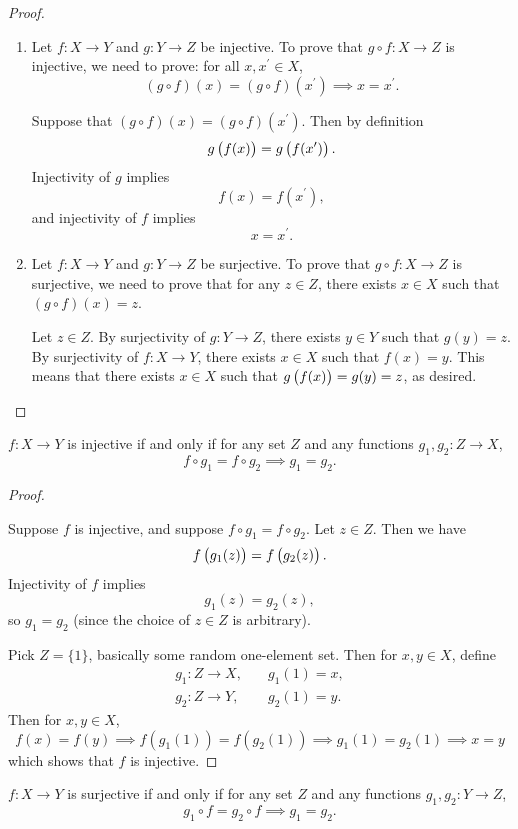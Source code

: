 \begin{proof} \
\begin{enumerate}[label=(\roman*)]
\item Let $f:X \to Y$ and $g:Y \to Z$ be injective. To prove that $g \circ f:X\to Z$ is injective, we need to prove: for all $x,x^\prime\in X$, 
\[(g \circ f)(x)=(g\circ f)(x^\prime) \implies x=x^\prime.\]

Suppose that $(g \circ f)(x) = (g \circ f)(x^\prime)$. Then by definition
\[g\left(f(x)\right)=g\left(f(x^\prime)\right).\]
Injectivity of $g$ implies
\[f(x)=f(x^\prime),\]
and injectivity of $f$ implies
\[x=x^\prime.\]

\item Let $f:X\to Y$ and $g:Y\to Z$ be surjective. To prove that $g\circ f:X\to Z$ is surjective, we need to prove that for any $z\in Z$, there exists $x\in X$ such that $(g\circ f)(x)=z$.

Let $z\in Z$. By surjectivity of $g:Y\to Z$, there exists $y\in Y$ such that $g(y)=z$. By surjectivity of $f:X\to Y$, there exists $x\in X$ such that $f(x)=y$. This means that there exists $x\in X$ such that $g\left(f(x)\right)=g(y)=z$, as desired.
\end{enumerate}
\end{proof}

\begin{proposition}
$f:X\to Y$ is injective if and only if for any set $Z$ and any functions $g_1,g_2:Z\to X$,
\[f\circ g_1=f\circ g_2 \implies g_1=g_2.\]
\end{proposition}

\begin{proof} \

\fbox{$\implies$} Suppose $f$ is injective, and suppose $f\circ g_1=f\circ g_2$. Let $z\in Z$. Then we have
\[f\left(g_1(z)\right)=f\left(g_2(z)\right).\]
Injectivity of $f$ implies
\[g_1(z)=g_2(z),\]
so $g_1=g_2$ (since the choice of $z\in Z$ is arbitrary).

\fbox{$\impliedby$} Pick $Z=\{1\}$, basically some random one-element set. Then for $x,y\in X$, define
\begin{align*}
g_1:Z\to X,&\quad g_1(1)=x,\\
g_2:Z\to Y,&\quad g_2(1)=y.
\end{align*}
Then for $x,y\in X$,
\[ f(x)=f(y) \implies f(g_1(1))=f(g_2(1)) \implies g_1(1)=g_2(1) \implies x=y \]
which shows that $f$ is injective.
\end{proof}

\begin{proposition}
$f:X\to Y$ is surjective if and only if for any set $Z$ and any functions $g_1,g_2:Y\to Z$,
\[g_1 \circ f=g_2 \circ f \implies g_1=g_2.\]
\end{proposition}

